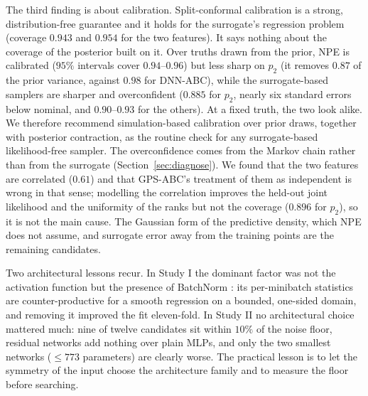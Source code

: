 \documentclass[sn-basic,iicol,pdflatex]{sn-jnl}
\begin{document}
The third finding is about calibration. Split-conformal calibration is a strong, distribution-free guarantee and it holds
for the surrogate's regression problem (coverage $0.943$ and $0.954$ for the two features). It says nothing about the
coverage of the posterior built on it. Over truths drawn from the prior, NPE is calibrated ($95\%$ intervals cover $0.94$--$0.96$) but
less sharp on $p_2$ (it removes $0.87$ of the prior variance, against $0.98$ for DNN-ABC), while the surrogate-based
samplers are sharper and overconfident ($0.885$ for $p_2$, nearly six standard errors below nominal, and $0.90$--$0.93$ for
the others). At a fixed truth, the two look alike. We therefore recommend simulation-based calibration over prior draws, together with posterior
contraction, as the routine check for any surrogate-based likelihood-free sampler. The overconfidence comes from the Markov chain rather than from the surrogate (Section~\ref{sec:diagnose}). We found that the two features are correlated ($0.61$) and that GPS-ABC's treatment of them as independent is wrong
in that sense; modelling the correlation improves the held-out joint likelihood and the uniformity of the ranks but not the coverage
($0.896$ for $p_2$), so it is not the main cause. The Gaussian form of the predictive density, which NPE does not assume, and
surrogate error away from the training points are the remaining candidates.

Two architectural lessons recur. In Study I the dominant factor was not the activation function but the presence of
BatchNorm \citep{ioffe2015}: its per-minibatch statistics are counter-productive for a smooth regression on a bounded,
one-sided domain, and removing it improved the fit eleven-fold. In Study II no architectural choice mattered much: nine of
twelve candidates sit within $10\%$ of the noise floor, residual networks add nothing over plain MLPs, and only the two
smallest networks ($\le 773$ parameters) are clearly worse. The practical lesson is to let the symmetry of the input choose the
architecture family \citep{radev2022} and to measure the floor before searching.
\end{document}
